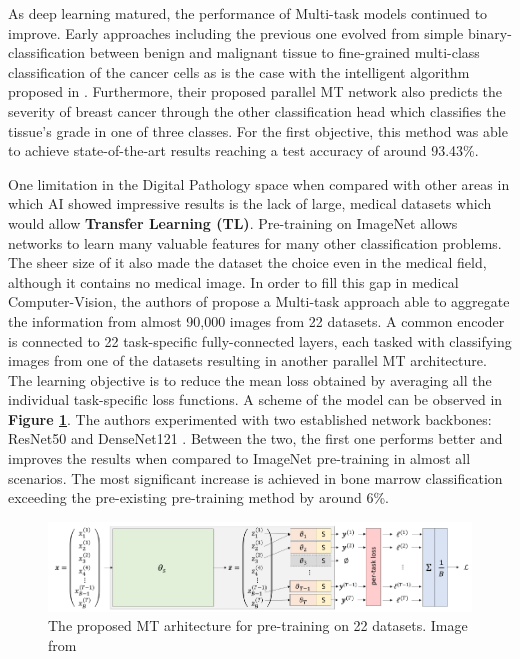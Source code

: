 As deep learning matured, the performance of Multi-task models continued to improve. Early approaches including the previous one evolved from simple binary-classification between benign and malignant tissue to fine-grained multi-class classification of the cancer cells as is the case with the intelligent algorithm proposed in \cite{li2020multi}. Furthermore, their proposed parallel MT network also predicts the severity of breast cancer through the other classification head which classifies the tissue's grade in one of three classes. For the first objective, this method was able to achieve state-of-the-art results reaching a test accuracy of around 93.43\%.

One limitation in the Digital Pathology space when compared with other areas in which AI showed impressive results is the lack of large, medical datasets which would allow \textbf{Transfer Learning (TL)}. Pre-training on ImageNet \cite{deng2009imagenet} allows networks to learn many valuable features for many other classification problems. The sheer size of it also made the dataset the choice even in the medical field, although it contains no medical image. In order to fill this gap in medical Computer-Vision, the authors of \cite{mormont2020multi} propose a Multi-task approach able to aggregate the information from almost 90,000 images from 22 datasets. A common encoder is connected to 22 task-specific fully-connected layers, each tasked with classifying images from one of the datasets resulting in another parallel MT architecture. The learning objective is to reduce the mean loss obtained by averaging all the individual task-specific loss functions. A scheme of the model can be observed in \textbf{Figure \ref{mt_pretaining}}. The authors experimented with two established network backbones: ResNet50 \cite{he2016deep} and DenseNet121 \cite{huang2017densely}. Between the two, the first one performs better and improves the results when compared to ImageNet pre-training in almost all scenarios. The most significant increase is achieved in bone marrow classification exceeding the pre-existing pre-training method by around 6\%.

\begin{figure}[htb]
    \centering
	\centerline{\includegraphics[scale=0.85]{figures/mt_pretraining.png}}
	\caption{The proposed MT arhitecture for pre-training on 22 datasets. Image from \cite{mormont2020multi}}
	\label{mt_pretaining}
\end{figure}

